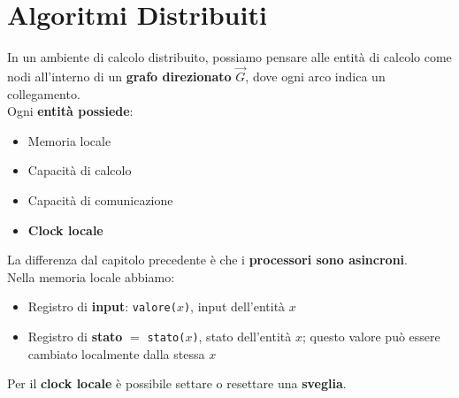 
\section{Algoritmi Distribuiti}

In un ambiente di calcolo distribuito, possiamo pensare alle entità di calcolo come nodi all'interno di un \textbf{grafo direzionato} $\vec G$, dove ogni arco indica un collegamento.\\

Ogni \textbf{entità possiede}:
\begin{itemize}
	\item Memoria locale
	\item Capacità di calcolo 
	\item Capacità di comunicazione
	\item \textbf{Clock locale}
\end{itemize} 

La differenza dal capitolo precedente è che i \textbf{processori sono asincroni}.\\

Nella memoria locale abbiamo: 
\begin{itemize}
	\item Registro di \textbf{input}: \texttt{valore($x$)}, input dell'entità $x$
	\item Registro di \textbf{stato} $=$ \texttt{stato($x$)}, stato dell'entità $x$; questo valore può essere cambiato localmente dalla stessa $x$
\end{itemize}

Per il \textbf{clock locale} è possibile settare o resettare una \textbf{sveglia}.\\
 \newpage

